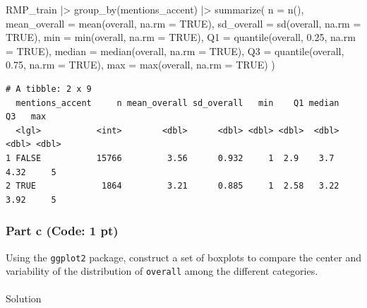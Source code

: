 \documentclass[
  letterpaper,
  DIV=11,
  numbers=noendperiod]{scrartcl}
\makeatletter
\let\oldparagraph\paragraph
\renewcommand{\paragraph}{
    \@ifstar
      \xxxParagraphStar
      \xxxParagraphNoStar
  }
\newcommand{\xxxParagraphStar}[1]{\oldparagraph*{#1}\mbox{}}
\newcommand{\xxxParagraphNoStar}[1]{\oldparagraph{#1}\mbox{}}
\newenvironment{Shaded}{\begin{snugshade}}{\end{snugshade}}
\newcommand{\AttributeTok}[1]{\textcolor[rgb]{0.40,0.45,0.13}{#1}}
\newcommand{\ConstantTok}[1]{\textcolor[rgb]{0.56,0.35,0.01}{#1}}
\newcommand{\FloatTok}[1]{\textcolor[rgb]{0.68,0.00,0.00}{#1}}
\newcommand{\FunctionTok}[1]{\textcolor[rgb]{0.28,0.35,0.67}{#1}}
\newcommand{\NormalTok}[1]{\textcolor[rgb]{0.00,0.23,0.31}{#1}}
\newcommand{\SpecialCharTok}[1]{\textcolor[rgb]{0.37,0.37,0.37}{#1}}
\makeatother
\begin{document}
\begin{Shaded}
\begin{Highlighting}[]
\NormalTok{RMP\_train }\SpecialCharTok{|\textgreater{}}
  \FunctionTok{group\_by}\NormalTok{(mentions\_accent) }\SpecialCharTok{|\textgreater{}}
  \FunctionTok{summarize}\NormalTok{(}
    \AttributeTok{n =} \FunctionTok{n}\NormalTok{(),}
    \AttributeTok{mean\_overall =} \FunctionTok{mean}\NormalTok{(overall, }\AttributeTok{na.rm =} \ConstantTok{TRUE}\NormalTok{),}
    \AttributeTok{sd\_overall =} \FunctionTok{sd}\NormalTok{(overall, }\AttributeTok{na.rm =} \ConstantTok{TRUE}\NormalTok{),}
    \AttributeTok{min =} \FunctionTok{min}\NormalTok{(overall, }\AttributeTok{na.rm =} \ConstantTok{TRUE}\NormalTok{),}
    \AttributeTok{Q1 =} \FunctionTok{quantile}\NormalTok{(overall, }\FloatTok{0.25}\NormalTok{, }\AttributeTok{na.rm =} \ConstantTok{TRUE}\NormalTok{),}
    \AttributeTok{median =} \FunctionTok{median}\NormalTok{(overall, }\AttributeTok{na.rm =} \ConstantTok{TRUE}\NormalTok{),}
    \AttributeTok{Q3 =} \FunctionTok{quantile}\NormalTok{(overall, }\FloatTok{0.75}\NormalTok{, }\AttributeTok{na.rm =} \ConstantTok{TRUE}\NormalTok{),}
    \AttributeTok{max =} \FunctionTok{max}\NormalTok{(overall, }\AttributeTok{na.rm =} \ConstantTok{TRUE}\NormalTok{)}
\NormalTok{  )}
\end{Highlighting}
\end{Shaded}

\begin{verbatim}
# A tibble: 2 x 9
  mentions_accent     n mean_overall sd_overall   min    Q1 median    Q3   max
  <lgl>           <int>        <dbl>      <dbl> <dbl> <dbl>  <dbl> <dbl> <dbl>
1 FALSE           15766         3.56      0.932     1  2.9    3.7   4.32     5
2 TRUE             1864         3.21      0.885     1  2.58   3.22  3.92     5
\end{verbatim}

\subsubsection{Part c (Code: 1 pt)}\label{part-c-code-1-pt-2}

Using the \texttt{ggplot2} package, construct a set of boxplots to
compare the center and variability of the distribution of
\texttt{overall} among the different categories.

\paragraph{Solution}\label{solution-10}
\end{document}
